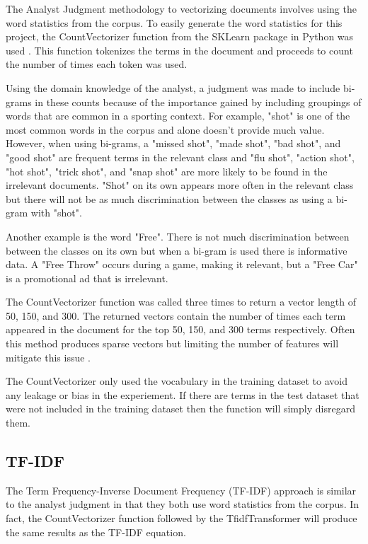 \documentclass[5p,authoryear]{elsarticle}
\begin{document}
The Analyst Judgment methodology to vectorizing documents involves using the word statistics from the corpus. 
To easily generate the word statistics for this project, the CountVectorizer function from the SKLearn package in Python was used \citep{countVec}.
This function tokenizes the terms in the document and proceeds to count the number of times each token was used.

Using the domain knowledge of the analyst, a judgment was made to include bi-grams in these counts because of the importance gained by including groupings of words that are common in a sporting context. 
For example, "shot" is one of the most common words in the corpus and alone doesn't provide much value. 
However, when using bi-grams, a "missed shot", "made shot", "bad shot", and "good shot" are frequent terms in the relevant class and "flu shot", "action shot", "hot shot", "trick shot", and "snap shot" are more likely to be found in the irrelevant documents. "Shot" on its own appears more often in the relevant class but there will not be as much discrimination between the classes as using a bi-gram with "shot".

Another example is the word "Free". There is not much discrimination between between the classes on its own but when a bi-gram is used there is informative data. A "Free Throw" occurs during a game, making it relevant, but a "Free Car" is a promotional ad that is irrelevant. 

The CountVectorizer function was called three times to return a vector length of 50, 150, and 300. 
The returned vectors contain the number of times each term appeared in the document for the top 50, 150, and 300 terms respectively. 
Often this method produces sparse vectors but limiting the number of features will mitigate this issue \citep{LeeCount}.

The CountVectorizer only used the vocabulary in the training dataset to avoid any leakage or bias in the experiement. 
If there are terms in the test dataset that were not included in the training dataset then the function will simply disregard them. 


\subsection{TF-IDF}\label{tfidf}

The Term Frequency-Inverse Document Frequency (TF-IDF) approach is similar to the analyst judgment in that they both use word statistics from the corpus. 
In fact, the CountVectorizer function followed by the TfidfTransformer will produce the same results as the TF-IDF equation. 
\end{document}
